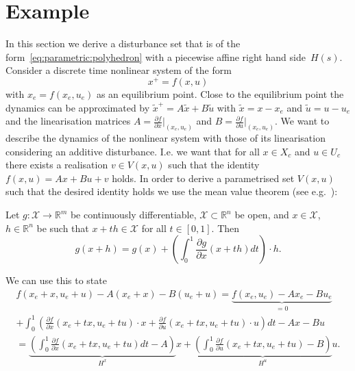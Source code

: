 \section{Example}\label{sec:example:linearisation:error:as:state:dependent:constraint}
In this section we derive a disturbance set that is of the form~\eqref{eq:parametric:polyhedron}
with a piecewise affine right hand side~$H(s)$. 
%
Consider a discrete time nonlinear system of the form
%
\begin{equation}
	x^+ = f(x,u)
\end{equation}
%
with $x_e=f(x_e,u_e)$ as an equilibrium point. 
%
Close to the equilibrium point the dynamics can be approximated by ${\tilde x}^+ = A \tilde x 
+ B\tilde u$ with $\tilde x = x-x_e$ and $\tilde u = u - u_e$ and the linearisation matrices
$A = \frac{\partial f}{\partial x}\vert_{(x_e,u_e)}$ and $B = \frac{\partial f}{\partial u}
\vert_{(x_e,u_e)}$.
%
We want to describe the dynamics of the nonlinear system with those of its linearisation considering
an additive disturbance. 
%
I.e. we want that for all $x\in X_c$ and $u\in U_c$ there exists a realisation 
$v\in V(x,u)$ such that the identity $f(x,u)=Ax + B u + v$ holds. 
%
In order to derive a parametrised set $V(x,u)$ such that the desired identity holds we use
the mean value theorem (see e.g.~\cite{Apostol:1974}):
%
\begin{thm}\label{thm:mean:value:theorem}
Let $g : \mathcal X \rightarrow\mathbb R^m$ be continuously
differentiable, $\mathcal X\subset\mathbb R^n$ be open,
and $x \in\mathcal X$, $h \in\mathbb R^n$ be such that 
$x + th \in\mathcal X$ for all $t\in [0 ,1]$. Then
\begin{equation}
	g(x+h) = g(x) + \left(\int_0^1 \frac{\partial g}{\partial x}(x+th)dt\right)\cdot h.
\end{equation}
\end{thm}
%
We can use this to state
%
\begin{equation}
\begin{split}
	f(x_e+x,u_e+u)-A(x_e+x)-B(u_e+u) = \underbrace{f(x_e,u_e) - A x_e - B u_e}_{=0} \\
	+ \int_0^1\left(\frac{\partial f}{\partial x}(x_e+tx,u_e+tu) \cdot x + 
	\frac{\partial f}{\partial u}(x_e+tx,u_e+tu) \cdot u \right) dt -Ax-Bu\\
	= \underbrace{\left(\int_0^1 \frac{\partial f}{\partial x}(x_e+tx,u_e+tu) dt - A\right)}_{H^x} x + 
	\underbrace{\left(\int_0^1 \frac{\partial f}{\partial u}(x_e+tx,u_e+tu) - B \right)}_{H^u} u.
\end{split}
\end{equation}
